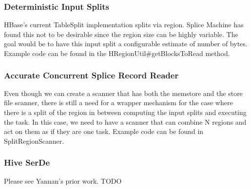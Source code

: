 \subsubsection{Deterministic Input Splits}
HBase's current TableSplit implementation splits via region.  Splice Machine has
found this not to be desirable since the region size can be highly variable. 
The goal would be to have this input split a configurable estimate of number of
bytes.  Example code can be found in the HRegionUtil#getBlocksToRead method.

\subsubsection{Accurate Concurrent Splice Record Reader}
Even though we can create a scanner that has both the memstore and the store
file scanner, there is still a need for a wrapper mechanism for the case where
there is a split of the region in between computing the input splits and executing the
task.  In this case, we need to have a scanner that can combine N regions and
act on them as if they are one task.  Example code can be found in
SplitRegionScanner.

\subsubsection{Hive SerDe}

Please see Yannan's prior work.  TODO

